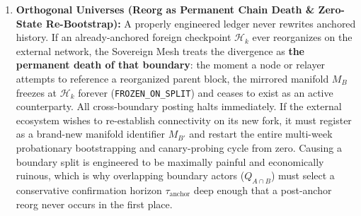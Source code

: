 \documentclass[a4paper,11pt,twoside,parskip=half-,headings=small]{scrartcl}
\newcommand{\code}[1]{\texttt{#1}}
\begin{document}
\begin{enumerate}[nosep]
  \item \textbf{Orthogonal Universes (Reorg as Permanent Chain Death \& Zero-State Re-Bootstrap):} A properly engineered ledger never rewrites anchored history. If an already-anchored foreign checkpoint $\mathcal{H}_k$ ever reorganizes on the external network, the Sovereign Mesh treats the divergence as \textbf{the permanent death of that boundary}: the moment a node or relayer attempts to reference a reorganized parent block, the mirrored manifold $M_B$ freezes at $\mathcal{H}_k$ forever (\code{FROZEN\_ON\_SPLIT}) and ceases to exist as an active counterparty. All cross-boundary posting halts immediately. If the external ecosystem wishes to re-establish connectivity on its new fork, it must register as a brand-new manifold identifier $M_{B'}$ and restart the entire multi-week probationary bootstrapping and canary-probing cycle from zero. Causing a boundary split is engineered to be maximally painful and economically ruinous, which is why overlapping boundary actors ($Q_{A \cap B}$) must select a conservative confirmation horizon $\tau_{\text{anchor}}$ deep enough that a post-anchor reorg never occurs in the first place.
\end{enumerate}
\end{document}
